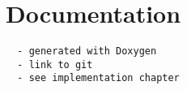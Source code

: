 \chapter{Documentation}
\begin{verbatim}
  - generated with Doxygen
  - link to git 
  - see implementation chapter 
\end{verbatim}

